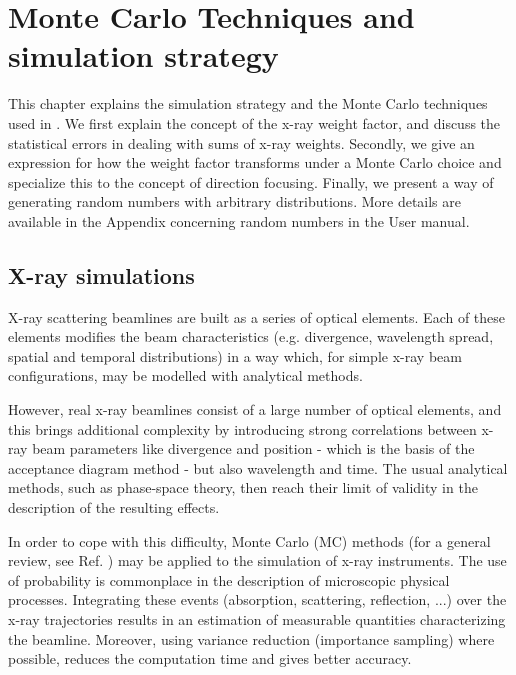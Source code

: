 \chapter{Monte Carlo Techniques and simulation strategy}
\label{c:MCtechniques}

This chapter explains the simulation strategy and the Monte Carlo
techniques used in \MCX. We first explain the concept of the x-ray
weight factor, and discuss the statistical errors in dealing with sums
of x-ray weights.  Secondly, we give an expression for how the weight
factor transforms under a Monte Carlo choice and specialize this
to the concept of direction focusing.  Finally, we present a way of
generating random numbers with arbitrary distributions.
More details are available in the Appendix concerning random numbers in the User manual.


\section{X-ray simulations}
X-ray scattering beamlines are built as a series of optical elements.
Each of these elements modifies the beam characteristics (e.g. divergence,
wavelength spread, spatial and temporal distributions) in a way which, for simple
x-ray beam configurations, may be modelled with analytical methods. 


However, real x-ray beamlines consist of a large number of optical
elements, and this brings additional complexity by introducing strong
correlations between x-ray beam parameters like divergence and position - which
is the basis of the acceptance diagram method - but also wavelength and time.
The usual analytical methods, such as phase-space theory, then reach their
limit of validity in the description of the resulting effects.

In order to cope with this difficulty, Monte Carlo (MC) methods (for a general review, see Ref. \cite{James80}) may be
applied to the simulation of x-ray instruments. The use of probability is commonplace in the description of microscopic
physical processes. Integrating these events (absorption, scattering, reflection, ...) over the x-ray trajectories
results in an estimation of measurable quantities characterizing the beamline. Moreover, using variance reduction
(importance sampling) where possible, reduces the computation time and gives better accuracy.

